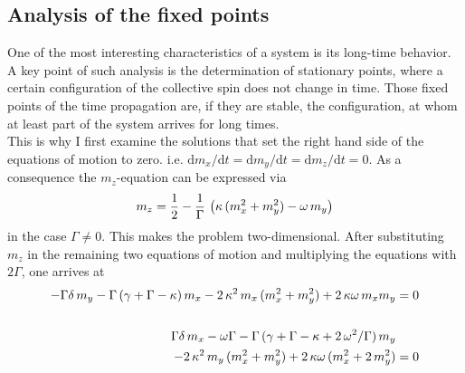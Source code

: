 \subsection{Analysis of the fixed points}
One of the most interesting characteristics of a system is its long-time behavior. A key point of such analysis is the determination of stationary points, where a certain configuration of the collective spin does not change in time. Those fixed points of the time propagation are, if they are stable, the configuration, at whom at least part of the system arrives for long times. \\
This is why I first examine the solutions that set the right hand side of the equations of motion to zero. i.e. $\text{d}m_x/\text{d}t=\text{d}m_y/\text{d}t=\text{d}m_z/\text{d}t=0$. As a consequence the $m_z$-equation can be expressed via
\begin{align}
    m_z=\frac{1}{2}-\frac{1}{\Gamma}\,\left(\kappa\,(m_x^2+ m_y^2)-\omega\,m_y  \right)
\end{align}
in the case $\Gamma\neq0$. This makes the problem two-dimensional. After substituting $m_z$ in the remaining two equations of motion and multiplying the equations with $2\Gamma$, one arrives at
\begin{align}-\Gamma\delta\,m_y-\Gamma\,(\gamma+\Gamma-\kappa)\,m_x-2\,\kappa^2\,m_x\,( m_x^2+ m_y^2)+2\,\kappa\omega\,m_xm_y  &=0\notag\\\notag\\
    \Gamma\delta\,m_x-\omega\Gamma-\Gamma\,(\gamma+\Gamma-\kappa+2\,\omega^2/\Gamma)\,m_y&\notag\\
    -2\,\kappa^2\,m_y\,( m_x^2+ m_y^2)+2\,\kappa\omega\,(m_x^2+2\,m_y^2)  &=0
\end{align}
